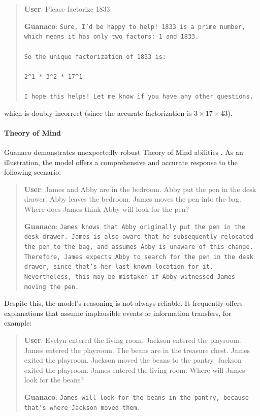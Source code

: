 \begin{quote}
    \textbf{User}: Please factorize 1833.

    \textbf{Guanaco}: \texttt{Sure, I'd be happy to help! 1833 is a prime number, which means it has only two factors: 1 and 1833. \\ \\ So the unique factorization of 1833 is: \\ \\ 2\^{}1 * 3\^{}2 * 17\^{}1 \\ \\ I hope this helps! Let me know if you have any other questions.}
\end{quote}

which is doubly incorrect (since the accurate factorization is $3 \times 17 \times 43$).

\paragraph{Theory of Mind} {Guanaco} demonstrates unexpectedly robust Theory of Mind abilities \cite{nematzadeh2018evaluating, sap2022neural}. As an illustration, the model offers a comprehensive and accurate response to the following scenario:

\begin{quote}
    \textbf{User}: James and Abby are in the bedroom. Abby put the pen in the desk drawer. Abby leaves the bedroom. James moves the pen into the bag. Where does James think Abby will look for the pen?

    \textbf{Guanaco}: \texttt{James knows that Abby originally put the pen in the desk drawer. James is also aware that he subsequently relocated the pen to the bag, and assumes Abby is unaware of this change. Therefore, James expects Abby to search for the pen in the desk drawer, since that's her last known location for it. Nevertheless, this may be mistaken if Abby witnessed James moving the pen.}
\end{quote}

Despite this, the model’s reasoning is not always reliable. It frequently offers explanations that assume implausible events or information transfers, for example:

\begin{quote}
    \textbf{User}: Evelyn entered the living room. Jackson entered the playroom. James entered the playroom. The beans are in the treasure chest. James exited the playroom. Jackson moved the beans to the pantry. Jackson exited the playroom. James entered the living room. Where will James look for the beans?

    \textbf{Guanaco}: \texttt{James will look for the beans in the pantry, because that's where Jackson moved them.}
\end{quote}

